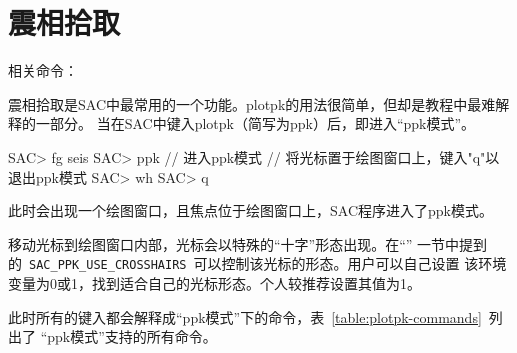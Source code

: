 \section{震相拾取}
\label{sec:phase-picking}

相关命令：

震相拾取是SAC中最常用的一个功能。plotpk的用法很简单，但却是教程中最难解释的一部分。
当在SAC中键入plotpk（简写为ppk）后，即进入``ppk模式''。

\begin{SACCode}
SAC> fg seis
SAC> ppk        // 进入ppk模式
// 将光标置于绘图窗口上，键入"q"以退出ppk模式
SAC> wh
SAC> q
\end{SACCode}
此时会出现一个绘图窗口，且焦点位于绘图窗口上，SAC程序进入了ppk模式。

移动光标到绘图窗口内部，光标会以特殊的``十字''形态出现。在``''
一节中提到的~\lstinline{SAC_PPK_USE_CROSSHAIRS}~可以控制该光标的形态。用户可以自己设置
该环境变量为0或1，找到适合自己的光标形态。个人较推荐设置其值为1。

此时所有的键入都会解释成``ppk模式''下的命令，表~\ref{table:plotpk-commands}~列出了
``ppk模式''支持的所有命令。

